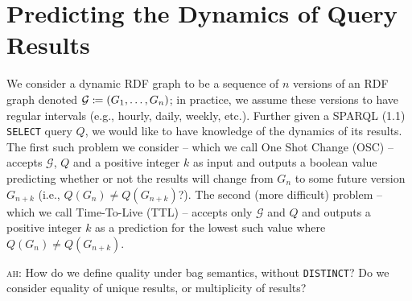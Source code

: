 \documentclass[runningheads]{llncs}
\newcommand{\da}{\ensuremath{:\nolinebreak\mkern-1.2mu\nolinebreak=}}
\newcommand{\ah}[1]{{\color{blue}\textsc{ah:} #1}}
\begin{document}
\section{Predicting the Dynamics of Query Results}
\label{sec:approach}

We consider a dynamic RDF graph to be a sequence of $n$ versions of an RDF graph denoted $\mathcal{G} \da ( G_1, \ldots, G_n )$; in practice, we assume these versions to have regular intervals (e.g., hourly, daily, weekly, etc.). Further given a SPARQL (1.1) \texttt{SELECT} query $Q$, we would like to have knowledge of the dynamics of its results. The first such problem we consider -- which we call One Shot Change (OSC) -- accepts $\mathcal{G}$, $Q$ and a positive integer $k$ as input and outputs a boolean value predicting whether or not the results will change from $G_n$ to some future version $G_{n+k}$ (i.e., $Q(G_n) \neq Q(G_{n+k})$?). The second (more difficult) problem -- which we call Time-To-Live (TTL) -- accepts only $\mathcal{G}$ and $Q$ and outputs a positive integer $k$ as a prediction for the lowest such value where $Q(G_n) \neq Q(G_{n+k})$.

\ah{How do we define quality under bag semantics, without \texttt{DISTINCT}? Do we consider equality of unique results, or multiplicity of results?}
\end{document}
